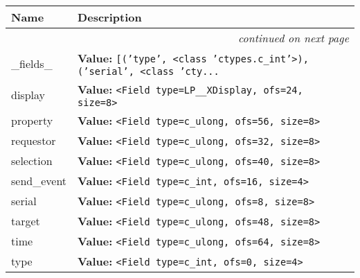     \vspace{-1cm}
\hspace{\varindent}\begin{longtable}{|p{\varnamewidth}|p{\vardescrwidth}|l}
\cline{1-2}
\cline{1-2} \centering \textbf{Name} & \centering \textbf{Description}& \\
\cline{1-2}
\endhead\cline{1-2}\multicolumn{3}{r}{\small\textit{continued on next page}}\\\endfoot\cline{1-2}
\endlastfoot\raggedright \_\-f\-i\-e\-l\-d\-s\-\_\- & \raggedright \textbf{Value:} 
{\tt \texttt{[}\texttt{(}\texttt{'}\texttt{type}\texttt{'}\texttt{, }{\textless}class 'ctypes.c\_int'{\textgreater}\texttt{)}\texttt{, }\texttt{(}\texttt{'}\texttt{serial}\texttt{'}\texttt{, }{\textless}class 'cty\texttt{...}}&\\
\cline{1-2}
\raggedright d\-i\-s\-p\-l\-a\-y\- & \raggedright \textbf{Value:} 
{\tt {\textless}Field type=LP\_\_XDisplay, ofs=24, size=8{\textgreater}}&\\
\cline{1-2}
\raggedright p\-r\-o\-p\-e\-r\-t\-y\- & \raggedright \textbf{Value:} 
{\tt {\textless}Field type=c\_ulong, ofs=56, size=8{\textgreater}}&\\
\cline{1-2}
\raggedright r\-e\-q\-u\-e\-s\-t\-o\-r\- & \raggedright \textbf{Value:} 
{\tt {\textless}Field type=c\_ulong, ofs=32, size=8{\textgreater}}&\\
\cline{1-2}
\raggedright s\-e\-l\-e\-c\-t\-i\-o\-n\- & \raggedright \textbf{Value:} 
{\tt {\textless}Field type=c\_ulong, ofs=40, size=8{\textgreater}}&\\
\cline{1-2}
\raggedright s\-e\-n\-d\-\_\-e\-v\-e\-n\-t\- & \raggedright \textbf{Value:} 
{\tt {\textless}Field type=c\_int, ofs=16, size=4{\textgreater}}&\\
\cline{1-2}
\raggedright s\-e\-r\-i\-a\-l\- & \raggedright \textbf{Value:} 
{\tt {\textless}Field type=c\_ulong, ofs=8, size=8{\textgreater}}&\\
\cline{1-2}
\raggedright t\-a\-r\-g\-e\-t\- & \raggedright \textbf{Value:} 
{\tt {\textless}Field type=c\_ulong, ofs=48, size=8{\textgreater}}&\\
\cline{1-2}
\raggedright t\-i\-m\-e\- & \raggedright \textbf{Value:} 
{\tt {\textless}Field type=c\_ulong, ofs=64, size=8{\textgreater}}&\\
\cline{1-2}
\raggedright t\-y\-p\-e\- & \raggedright \textbf{Value:} 
{\tt {\textless}Field type=c\_int, ofs=0, size=4{\textgreater}}&\\
\cline{1-2}
\end{longtable}


